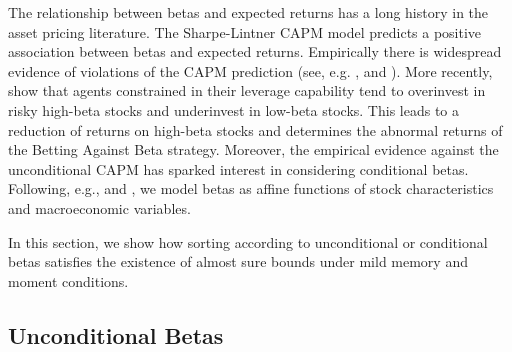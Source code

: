 The relationship between betas and expected returns has a long history in the asset pricing literature. The Sharpe-Lintner CAPM model \citep{sharpe1964capital, lintner1965valuation} predicts a positive association between betas and expected returns. Empirically there is widespread evidence of violations of the CAPM prediction (see, e.g. \cite{black1972capital}, \cite{fama1992cross} and \cite{fama2006value}). More recently, \cite{frazzini2014betting} show that agents constrained in their leverage capability tend to overinvest in risky high-beta stocks and underinvest in low-beta stocks. This leads to a reduction of returns on high-beta stocks and determines the abnormal returns of the Betting Against Beta strategy. Moreover, the empirical evidence against the unconditional CAPM has sparked interest in considering conditional betas. Following, e.g., \cite{shanken1990intertemporal} and \cite{cederburg2016does}, we model betas as affine functions of stock characteristics and macroeconomic variables.

In this section, we show how sorting according to unconditional or conditional betas satisfies the existence of almost sure bounds under mild memory and moment conditions.

\subsection{Unconditional Betas}

